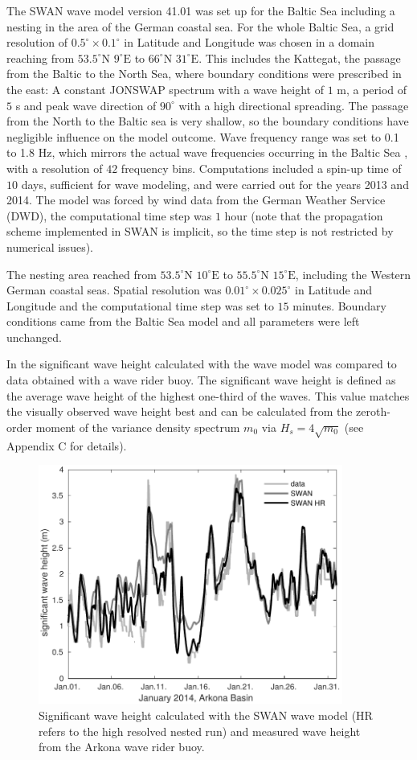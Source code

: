 The SWAN wave model version 41.01 was set up for the Baltic Sea including a 
nesting in the area of the German coastal sea. For the whole Baltic Sea, a grid 
resolution of $0.5^\circ \times 0.1^\circ $ in Latitude and Longitude was 
chosen 
in a domain reaching from $53.5^\circ \text{N } 9^\circ \text{E}$ to $66^\circ 
\text{N } 31^\circ \text{E}$. This includes the Kattegat, the passage from the 
Baltic to the North Sea, where boundary conditions were prescribed in the east: 
A constant JONSWAP spectrum with a wave height of $1$ m, a period of $5$ s and 
peak wave direction of $90^\circ$ with a high directional spreading. The 
passage 
from the North to the Baltic sea is very shallow, so the boundary conditions 
have negligible influence on the model outcome. Wave frequency range was set to 
0.1 to 1.8 Hz, which mirrors the actual wave frequencies occurring in the 
Baltic Sea \citep[][]{balticsea}, with a resolution of $42$ frequency bins. 
Computations included a spin-up time of $10$ days, sufficient for wave 
modeling, 
and were carried out for the years 2013 and 2014. The model was forced by wind 
data from the German Weather Service (DWD), the computational time step was $1$ 
hour (note that the propagation scheme implemented in SWAN is implicit, so the 
time step is not restricted by numerical issues). 

The nesting area reached from $53.5^\circ \text{N } 10^\circ \text{E}$ to 
$55.5^\circ \text{N } 15^\circ \text{E}$, including the Western German coastal 
seas. Spatial resolution was $0.01^\circ \times 0.025^\circ $ in Latitude and 
Longitude and the computational time step was set to $15$ minutes. Boundary 
conditions came from the Baltic Sea model and all parameters were left 
unchanged.

In  the significant wave height calculated with the wave model was 
compared to data obtained with a wave rider buoy. The significant wave height 
is defined as the average wave height of the highest one-third of the waves. 
This value matches the visually observed wave height best and can be calculated 
from the zeroth-order moment of the variance density spectrum $m_0$ via 
$H_s = 4 \sqrt{m_0}$ (see Appendix C for details).
\begin{figure}[ht]
 \includegraphics[width=10cm]{bilder/januar.pdf}
 \caption{Significant wave height calculated with the SWAN wave model (HR 
refers to the high resolved nested run) and measured wave height from the 
Arkona wave rider buoy.\label{verify}}
\end{figure}

